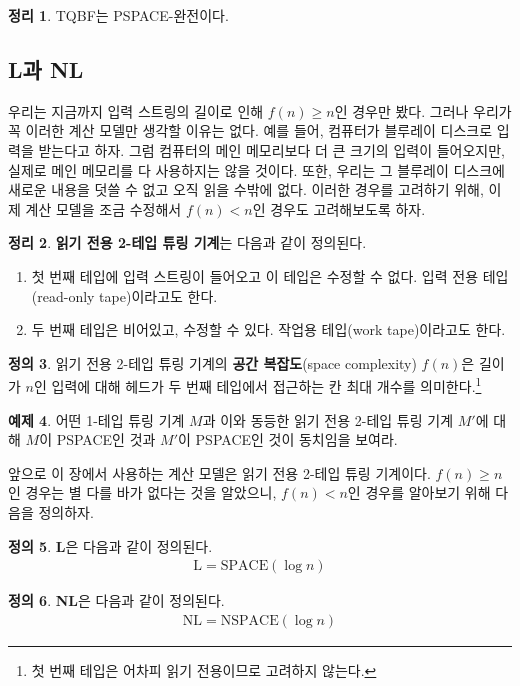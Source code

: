 \documentclass[a4paper, 11pt]{article}
\theoremstyle{definition}
\newtheorem{defn}{정의}[section]
\newtheorem{thm}[defn]{정리}
\newtheorem{ex}[defn]{예제}
\begin{document}
\begin{thm}
    TQBF는 PSPACE-완전이다.
\end{thm}
\subsection{L과 NL}
우리는 지금까지 입력 스트링의 길이로 인해 $f(n) \ge n$인 경우만 봤다. 그러나 우리가 꼭 이러한 계산 모델만 생각할 이유는 없다. 예를 들어, 컴퓨터가 블루레이 디스크로 입력을 받는다고 하자. 그럼 컴퓨터의 메인 메모리보다 더 큰 크기의 입력이 들어오지만, 실제로 메인 메모리를 다 사용하지는 않을 것이다. 또한, 우리는 그 블루레이 디스크에 새로운 내용을 덧쓸 수 없고 오직 읽을 수밖에 없다. 이러한 경우를 고려하기 위해, 이제 계산 모델을 조금 수정해서 $f(n) < n$인 경우도 고려해보도록 하자.
\begin{thm}
    \textbf{읽기 전용 2-테입 튜링 기계}는 다음과 같이 정의된다.
    \begin{enumerate}
        \item 첫 번째 테입에 입력 스트링이 들어오고 이 테입은 수정할 수 없다. 입력 전용 테입(read-only tape)이라고도 한다.
        \item 두 번째 테입은 비어있고, 수정할 수 있다. 작업용 테입(work tape)이라고도 한다.
    \end{enumerate}
\end{thm}
\begin{defn}
    읽기 전용 2-테입 튜링 기계의 \textbf{공간 복잡도}(space complexity) $f(n)$은 길이가 $n$인 입력에 대해 헤드가 두 번째 테입에서 접근하는 칸 최대 개수를 의미한다.\footnote{첫 번째 테입은 어차피 읽기 전용이므로 고려하지 않는다.}
\end{defn}
\begin{ex}
    어떤 1-테입 튜링 기계 $M$과 이와 동등한 읽기 전용 2-테입 튜링 기계 $M'$에 대해 $M$이 PSPACE인 것과 $M'$이 PSPACE인 것이 동치임을 보여라.
\end{ex}
앞으로 이 장에서 사용하는 계산 모델은 읽기 전용 2-테입 튜링 기계이다. $f(n) \ge n$인 경우는 별 다를 바가 없다는 것을 알았으니, $f(n) < n$인 경우를 알아보기 위해 다음을 정의하자.
\begin{defn}
    \textbf{L}은 다음과 같이 정의된다.
    \begin{align*}
        \text{L} = \text{SPACE}(\log{n})
    \end{align*}
\end{defn}
\begin{defn}
    \textbf{NL}은 다음과 같이 정의된다.
    \begin{align*}
        \text{NL} = \text{NSPACE}(\log{n})
    \end{align*}
\end{defn}
\end{document}
